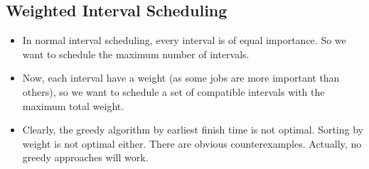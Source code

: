 \documentclass[a4paper,12pt]{article}
\begin{document}
\subsection{Weighted Interval Scheduling}
\begin{itemize}
    \item In normal interval scheduling, every interval is of equal importance. So we want to schedule the maximum number of intervals.
    \item Now, each interval have a weight (as some jobs are more important than others), so we want to schedule a set of compatible intervals with the maximum total weight.
    \item Clearly, the greedy algorithm by earliest finish time is not optimal. Sorting by weight is not optimal either. There are obvious counterexamples. Actually, no greedy approaches will work.
\end{itemize}
\end{document}
